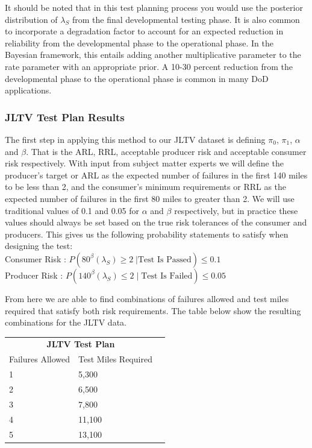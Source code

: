 \documentclass[12pt]{article}
\begin{document}
It should be noted that in this test planning process you would use the
posterior distribution of $\lambda_S$ from the final developmental testing
phase.  It is also common to incorporate a degradation factor to account for an
expected reduction in reliability from the developmental phase to the
operational phase.  In the Bayesian framework, this entails adding another
multiplicative parameter to the rate parameter with an appropriate prior.   A
10-30 percent reduction from the developmental phase to the operational phase is
common in many DoD applications.

\subsubsection{JLTV Test Plan Results}
The first step in applying this method to our JLTV dataset is defining $\pi_0$,
$\pi_1$, $\alpha$ and $\beta$.  That is the ARL, RRL, acceptable producer risk
and acceptable consumer risk respectively.  With input from subject matter
experts  we will define the producer's target or ARL as the expected number of
failures in the first 140 miles to be less  than 2, and the consumer's minimum
requirements or RRL as the expected number of failures in  the first 80 miles to
greater than 2.  We will use traditional values of 0.1 and 0.05 for $\alpha$ and
$\beta$ respectively, but in practice these values should always be set based on
the true risk tolerances of the consumer and producers.  This gives us the
following probability statements to satisfy when designing the test:
\\
Consumer Risk : $ P(80^\beta (\lambda_S) \geq 2 \; \vert \text{Test Is Passed}) \leq 0.1 $ \\
Producer Risk : $ P(140^\beta (\lambda_S) \leq 2 \; \vert \; \text{Test Is Failed}) \leq 0.05 $

From here we are able to find combinations of failures allowed and test miles
required that satisfy both risk requirements.  The table below show the
resulting combinations for the JLTV data.

\begin{tabular}{|l|l|r|}
\multicolumn{2}{c}{\textbf{JLTV Test Plan}} \\
\cline{1-2}
Failures Allowed    & Test Miles Required \\
\hline
1   & 5,300      \\
2   & 6,500      \\
3   & 7,800      \\
4   & 11,100     \\
5   & 13,100     \\
\hline
\end{tabular}
\end{document}
